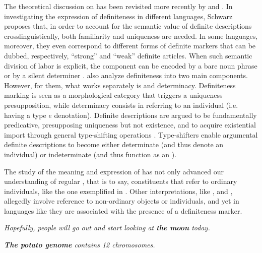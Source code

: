 \documentclass[output=paper]{langsci/langscibook}
\begin{document}
The theoretical discussion on  has been revisited more recently by \citet{Schwarz2009,Schwarz2013} and \citet{CoppockBeaver2015}. In investigating the expression of definiteness in different languages, Schwarz proposes that, in order to account for the semantic value of definite descriptions crosslinguistically, both familiarity and uniqueness are needed. In some languages, moreover, they even correspond to different forms of definite markers that can be dubbed, respectively, “strong” and “weak” definite articles. When such semantic division of labor is explicit, the  component can be encoded by a bare noun phrase or by a silent determiner \citep{ArkohMatthewson2013}. \citet{CoppockBeaver2015} also analyze definiteness into two main components. However, for them, what works separately is  and determinacy. Definiteness marking is seen as a morphological category that triggers a uniqueness presupposition, while determinacy consists in referring to an individual (i.e. having a type $e$ denotation). Definite descriptions are argued to be fundamentally predicative, presupposing uniqueness but not existence, and to acquire existential import through general type-shifting operations \citep{Partee1987}. Type-shifters enable argumental definite descriptions to become either determinate (and thus denote an individual) or indeterminate (and thus function as an ). 

The study of the meaning and expression of  has not only advanced our understanding of regular , that is to say, constituents that refer to ordinary individuals, like the one exemplified in . Other interpretations, like  ,   and  , allegedly involve reference to non-ordinary objects or individuals, and yet in languages like  they are associated with the presence of a definiteness marker.

\ea
	\ea \label{ex:aguilar:1a}
	\textit{Hopefully, people will go out and start looking at \textbf{the moon} today.} %
	
	\ex \label{ex:aguilar:1b}
	\textit{\textbf{The potato genome} contains 12 chromosomes.} %
	
\end{document}
